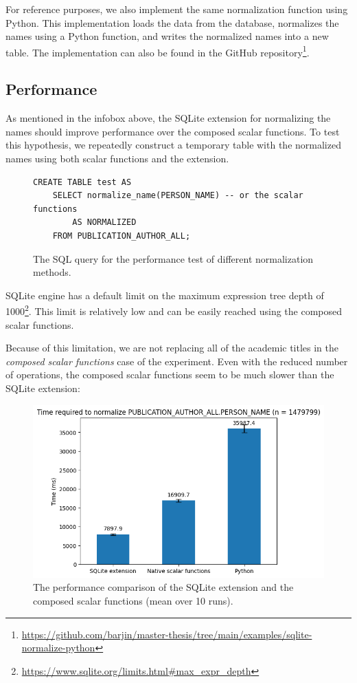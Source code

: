 For reference purposes, we also implement the same normalization function using Python.
This implementation loads the data from the database, normalizes the names using a Python function, and writes the normalized names into a new table.
The implementation can also be found in the GitHub repository\footnote{\url{https://github.com/barjin/master-thesis/tree/main/examples/sqlite-normalize-python}}.

\subsection{Performance}

As mentioned in the infobox above, the SQLite extension for normalizing the names should improve performance over the composed scalar functions.
To test this hypothesis, we repeatedly construct a temporary table with the normalized names using both scalar functions and the extension.

\begin{figure}[!ht]
\begin{verbatim}
CREATE TABLE test AS 
    SELECT normalize_name(PERSON_NAME) -- or the scalar functions
        AS NORMALIZED 
    FROM PUBLICATION_AUTHOR_ALL;
\end{verbatim}
\captionsetup{width=.9\linewidth}
\caption{The SQL query for the performance test of different normalization methods.}

\end{figure}

SQLite engine has a default limit on the maximum expression tree depth of 1000\footnote{\url{https://www.sqlite.org/limits.html\#max_expr_depth}}.
This limit is relatively low and can be easily reached using the composed scalar functions.

Because of this limitation, we are not replacing all of the academic titles in the \textit{composed scalar functions} case of the experiment.
Even with the reduced number of operations, the composed scalar functions seem to be much slower than the SQLite extension:

\begin{figure}[ht!]
    \captionsetup{width=.9\linewidth}
    \includegraphics[width=\textwidth]{../img/sqlite_vs_native_scalar_functions.png}
    \centering
    \caption{The performance comparison of the SQLite extension and the composed scalar functions (mean over 10 runs).}
\end{figure}

